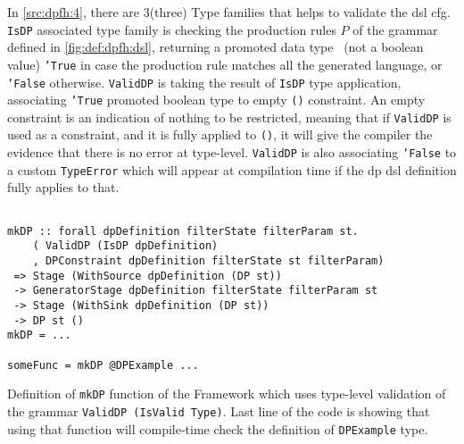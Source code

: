 In \autoref{src:dpfh:4}, there are 3(three) Type families that helps to validate the \acrshort{dsl} \acrshort{cfg}. 
\texttt{IsDP} associated type family is checking the production rules $P$ of the grammar defined in \autoref{fig:def:dpfh:dsl}, returning a promoted data type~\cite{promoted-types} (not a boolean value) \texttt{'True} in case
the production rule matches all the generated language, or \texttt{'False} otherwise. 
\texttt{ValidDP} is taking the result of \texttt{IsDP} type application, associating \texttt{'True} promoted boolean type to empty \texttt{()} constraint. An empty constraint is an 
indication of nothing to be restricted, meaning that if \texttt{ValidDP} is used as a constraint, and it is fully applied to \texttt{()}, it will give the compiler the evidence that there is no error at type-level.
\texttt{ValidDP} is also associating \texttt{'False} to a custom \texttt{TypeError} which will appear at compilation time if the \acrshort{dp} \acrshort{dsl} definition fully applies to that.

\begin{listing}[htp!]
  \begin{verbatim}

mkDP :: forall dpDefinition filterState filterParam st.
    ( ValidDP (IsDP dpDefinition)
    , DPConstraint dpDefinition filterState st filterParam)
 => Stage (WithSource dpDefinition (DP st)) 
 -> GeneratorStage dpDefinition filterState filterParam st  
 -> Stage (WithSink dpDefinition (DP st))  
 -> DP st ()
mkDP = ...

someFunc = mkDP @DPExample ...

  \end{verbatim}
  \caption[{[\texttt{Stage.hs}] Using validation of \acrshort{dp} encoded in $G_{dsl}$}]{Definition of \texttt{mkDP} function of the Framework which uses type-level validation of the grammar \texttt{ValidDP (IsValid Type)}. Last line of the code is showing that using that function will compile-time check the definition of \texttt{DPExample} type.}
  \label{src:dpfh:5}
\end{listing}

